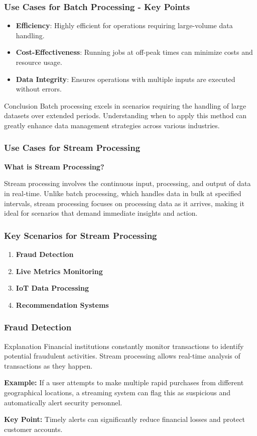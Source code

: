 \documentclass{beamer}
\begin{document}
\begin{frame}[fragile]
    \frametitle{Use Cases for Batch Processing - Key Points}
    \begin{itemize}
        \item \textbf{Efficiency}: Highly efficient for operations requiring large-volume data handling.
        \item \textbf{Cost-Effectiveness}: Running jobs at off-peak times can minimize costs and resource usage.
        \item \textbf{Data Integrity}: Ensures operations with multiple inputs are executed without errors.
    \end{itemize}

    \begin{block}{Conclusion}
        Batch processing excels in scenarios requiring the handling of large datasets over extended periods. Understanding when to apply this method can greatly enhance data management strategies across various industries.
    \end{block}
\end{frame}

\begin{frame}[fragile]
    \frametitle{Use Cases for Stream Processing}
    \textbf{What is Stream Processing?}
    
    Stream processing involves the continuous input, processing, and output of data in real-time. 
    Unlike batch processing, which handles data in bulk at specified intervals, stream processing focuses on processing data as it arrives,
    making it ideal for scenarios that demand immediate insights and action.
\end{frame}

\begin{frame}[fragile]
    \frametitle{Key Scenarios for Stream Processing}
    \begin{enumerate}
        \item \textbf{Fraud Detection}
        \item \textbf{Live Metrics Monitoring}
        \item \textbf{IoT Data Processing}
        \item \textbf{Recommendation Systems}
    \end{enumerate}
\end{frame}

\begin{frame}[fragile]
    \frametitle{Fraud Detection}
    \begin{block}{Explanation}
        Financial institutions constantly monitor transactions to identify potential fraudulent activities. 
        Stream processing allows real-time analysis of transactions as they happen.
    \end{block}
    
    \textbf{Example:} 
    If a user attempts to make multiple rapid purchases from different geographical locations, 
    a streaming system can flag this as suspicious and automatically alert security personnel.
    
    \textbf{Key Point:} 
    Timely alerts can significantly reduce financial losses and protect customer accounts.
\end{frame}
\end{document}
